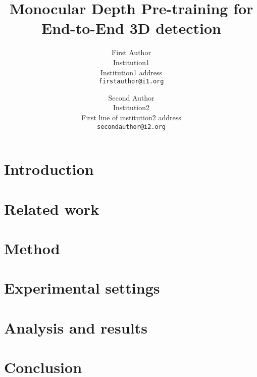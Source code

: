 \documentclass[10pt,twocolumn,letterpaper]{article}
\begin{document}
\title{Monocular Depth Pre-training for End-to-End 3D detection}

\author{First Author\\
Institution1\\
Institution1 address\\
{\tt\small firstauthor@i1.org}
\and
Second Author\\
Institution2\\
First line of institution2 address\\
{\tt\small secondauthor@i2.org}
}

\maketitle
\ificcvfinal\thispagestyle{empty}\fi

\begin{abstract}

\end{abstract}

\section{Introduction}


\section{Related work}


\section{Method}
\label{sec:method}


\section{Experimental settings}
\label{sec:experiments}


\section{Analysis and results}
\label{sec:results}


\section{Conclusion}


{\small


}
\end{document}
